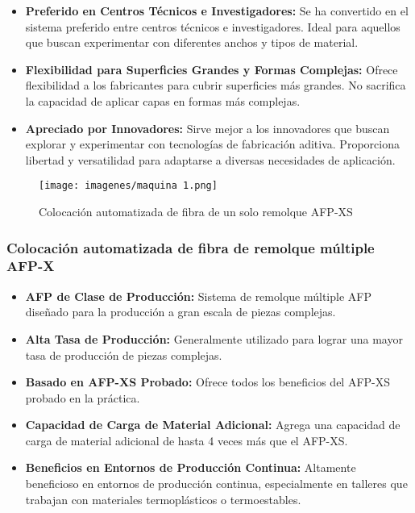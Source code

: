 \begin{enumerate}[label=\arabic*.]
\begin{itemize}
    \item \textbf{Preferido en Centros Técnicos e Investigadores:}
        Se ha convertido en el sistema preferido entre centros técnicos e investigadores. Ideal para aquellos que buscan experimentar con diferentes anchos y tipos de material.
    
    \item \textbf{Flexibilidad para Superficies Grandes y Formas Complejas:}
        Ofrece flexibilidad a los fabricantes para cubrir superficies más grandes. No sacrifica la capacidad de aplicar capas en formas más complejas.
    
    \item \textbf{Apreciado por Innovadores:}
        Sirve mejor a los innovadores que buscan explorar y experimentar con tecnologías de fabricación aditiva. Proporciona libertad y versatilidad para adaptarse a diversas necesidades de aplicación.
\end{itemize}

\begin{figure}[h]
    \centering
    \texttt{[image: imagenes/maquina 1.png]}
    \caption{Colocación automatizada de fibra de un solo remolque AFP-XS}
    \label{fig:enter-label}
\end{figure}

\subsubsection{Colocación automatizada de fibra de remolque múltiple  AFP-X }

\begin{itemize}
    \item \textbf{AFP de Clase de Producción:}
        Sistema de remolque múltiple AFP diseñado para la producción a gran escala de piezas complejas.
    
    \item \textbf{Alta Tasa de Producción:}
        Generalmente utilizado para lograr una mayor tasa de producción de piezas complejas.

    \item \textbf{Basado en AFP-XS Probado:}
        Ofrece todos los beneficios del AFP-XS probado en la práctica.

    \item \textbf{Capacidad de Carga de Material Adicional:}
        Agrega una capacidad de carga de material adicional de hasta 4 veces más que el AFP-XS.

    \item \textbf{Beneficios en Entornos de Producción Continua:}
        Altamente beneficioso en entornos de producción continua, especialmente en talleres que trabajan con materiales termoplásticos o termoestables.
\end{itemize}


\end{enumerate}
